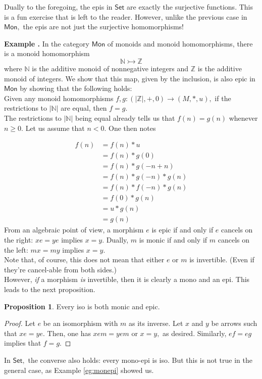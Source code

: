 \documentclass[11pt,leqno,landscape,semhelv]{seminar}
\numberwithin{equation}{section}
\theoremstyle{definition}
\newtheorem{prop}[thm]{Proposition}
\numberwithin{thm}{section}
\numberwithin{equation}{section}
\newcommand{\example}[1]{\refstepcounter{thm}\par\medskip
   {\textbf{Example \thethm.} #1} \rmfamily}
\newcommand{\mono}{\rightarrowtail}
\begin{document}
Dually to the foregoing, the epis in $\mathsf{Set}$ are exactly the surjective functions. This is a fun exercise that is left to the reader. However, unlike the previous case in $\mathsf{Mon},$ the epis are not just the surjective homomorphisms!\\
\example{\label{eg:monepi}} In the category $\mathsf{Mon}$ of monoids and monoid homomorphisms, there is a monoid homomorphism
\begin{equation*} 
	\mathbb{N} \mono \mathbb{Z}
\end{equation*}
where $\mathbb{N}$ is the additive monoid of nonnegative integers and $\mathbb{Z}$ is the additive monoid of integers. We show that this map, given by the inclusion, is also epic in $\mathsf{Mon}$ by showing that the following holds:\\
Given any monoid homomorphisms $f, g: (|\mathbb{Z}|, +, 0) \to (M, *, u),$ if the restrictions to $|\mathbb{N}|$ are equal, then $f = g.$\\
The restrictions to $|\mathbb{N}|$ being equal already tells us that $f(n) = g(n)$ whenever $n \ge 0.$ Let us assume that $n < 0.$ One then notes

\begin{align*} 
	f(n) &= f(n)*u\\
	&= f(n)*g(0)\\
	&= f(n)*g(-n + n)\\
	&= f(n)*g(-n)*g(n)\\
	&= f(n)*f(-n)*g(n)\\
	&= f(0)*g(n)\\
	&= u*g(n)\\
	&= g(n)
\end{align*}
From an algebraic point of view, a morphism $e$ is epic if and only if $e$ cancels on the right: $xe = ye$ implies $x = y.$ Dually, $m$ is monic if and only if $m$ cancels on the left: $mx = my$ implies $x = y.$\\
Note that, of course, this does not mean that either $e$ or $m$ is invertible. (Even if they're cancel-able from both sides.)\\
However, \emph{if} a morphism \emph{is} invertible, then it is clearly a mono and an epi. This leads to the next proposition.
\begin{prop}
	Every iso is both monic and epic.
\end{prop}
\begin{proof} 
	Let $e$ be an isomorphism with $m$ as its inverse. Let $x$ and $y$ be arrows such that $xe = ye.$ Then, one has $xem = yem$ or $x = y,$ as desired. Similarly, $ef = eg$ implies that $f = g.$ 
\end{proof}
In $\mathsf{Set},$ the converse also holds: every mono-epi is iso. But this is not true in the general case, as Example \ref{eg:monepi} showed us.
\end{document}
